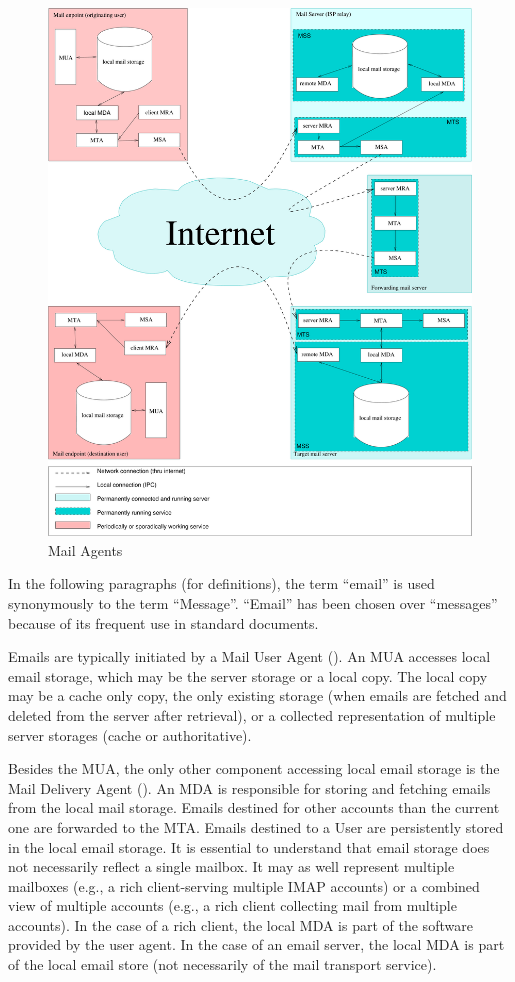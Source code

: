 \begin{figure}[ht!]
	\centering\includegraphics[width=\columnwidth]{inc/MailAgents1.pdf}
	\caption{Mail Agents}
	\label{fig:MailAgents}
\end{figure}

In the following paragraphs (for definitions), the term ``email'' is used synonymously to the term ``Message''.  ``Email'' has been chosen over ``messages'' because of its frequent use in standard documents.

Emails are typically initiated by a Mail User Agent (). An MUA accesses local email storage, which may be the server storage or a local copy. The local copy may be a cache only copy, the only existing storage (when emails are fetched and deleted from the server after retrieval), or a collected representation of multiple server storages (cache or authoritative).

Besides the MUA, the only other component accessing local email storage is the Mail Delivery Agent (). An MDA is responsible for storing and fetching emails from the local mail storage. Emails destined for other accounts than the current one are forwarded to the MTA. Emails destined to a User are persistently stored in the local email storage. It is essential to understand that email storage does not necessarily reflect a single mailbox. It may as well represent multiple mailboxes (e.g., a rich client-serving multiple IMAP accounts) or a combined view of multiple accounts (e.g., a rich client collecting mail from multiple  accounts). In the case of a rich client, the local MDA is part of the software provided by the user agent. In the case of an email server, the local MDA is part of the local email store (not necessarily of the mail transport service).

